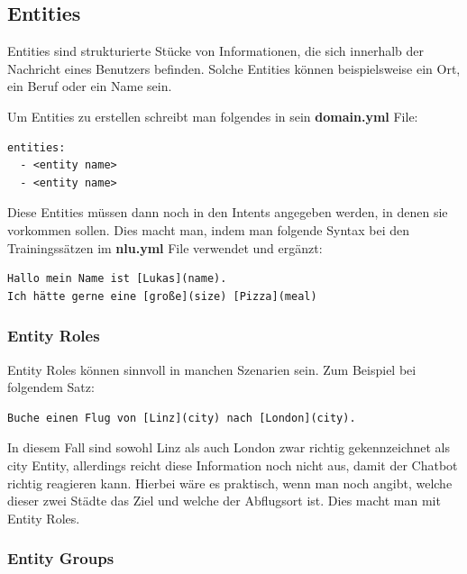 \subsection{Entities}

Entities sind strukturierte Stücke von Informationen, die sich innerhalb der Nachricht eines Benutzers befinden.
Solche Entities können beispielsweise ein Ort, ein Beruf oder ein Name sein.\cite{entities}

Um Entities zu erstellen schreibt man folgendes in sein \textbf{domain.yml} File:

\begin{lstlisting}[label={lst: Entities Domain Example}]
entities:
  - <entity name>
  - <entity name>
\end{lstlisting}

Diese Entities müssen dann noch in den Intents angegeben werden, in denen sie vorkommen sollen.
Dies macht man, indem man folgende Syntax bei den Trainingssätzen im \textbf{nlu.yml} File verwendet und ergänzt:

\begin{lstlisting}[label={lst: Entities NLU Example}]
Hallo mein Name ist [Lukas](name).
Ich hätte gerne eine [große](size) [Pizza](meal)
\end{lstlisting}

\subsubsection{Entity Roles}

Entity Roles können sinnvoll in manchen Szenarien sein.
Zum Beispiel bei folgendem Satz:

\begin{lstlisting}[label={lst: Entity Roles Example}]
Buche einen Flug von [Linz](city) nach [London](city).
\end{lstlisting}

In diesem Fall sind sowohl Linz als auch London zwar richtig gekennzeichnet als city Entity, allerdings reicht diese Information noch nicht aus, damit der Chatbot richtig reagieren kann.
Hierbei wäre es praktisch, wenn man noch angibt, welche dieser zwei Städte das Ziel und welche der Abflugsort ist.
Dies macht man mit Entity Roles.\cite{entityRolesGroups}

\subsubsection{Entity Groups}

